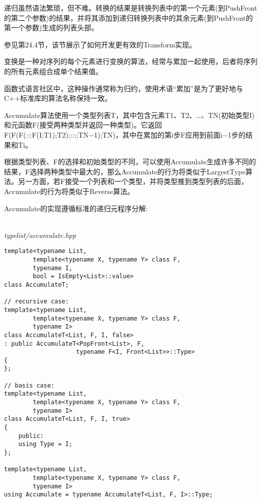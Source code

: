 递归虽然语法繁琐，但不难。转换的结果是转换列表中的第一个元素(到PushFront的第二个参数)的结果，并将其添加到递归转换列表中的其余元素(到PushFront的第一个参数)生成的列表头部。

参见第24.4节，该节展示了如何开发更有效的Transform实现。


变换是一种对序列的每个元素进行变换的算法，经常与累加一起使用，后者将序列的所有元素组合成单个结果值。

\begin{tcolorbox}[colback=webgreen!5!white,colframe=webgreen!75!black]
\hspace*{0.75cm}函数式语言社区中，这种操作通常称为归约，使用术语“累加”是为了更好地与C++标准库的算法名称保持一致。
\end{tcolorbox}

Accumulate算法使用一个类型列表T，其中包含元素T1、T2、…、TN(初始类型I)和元函数F(接受两种类型并返回一种类型)。它返回F(F(F(:::F(I;T1);T2);:::;TN−1);TN)，其中在累加的第i步F应用到前面i−1步的结果和Ti。

根据类型列表、F的选择和初始类型的不同，可以使用Accumulate生成许多不同的结果，F选择两种类型中最大的，那么Accumulate的行为将类似于LargestType算法。另一方面，若F接受一个列表和一个类型，并将类型推到类型列表的后面，Accumulate的行为将类似于Reverse算法。

Accumulate的实现遵循标准的递归元程序分解:

\hspace*{\fill} \\ %
\noindent
\textit{typelist/accumulate.hpp}
\begin{lstlisting}[style=styleCXX]
template<typename List,
		template<typename X, typename Y> class F,
		typename I,
		bool = IsEmpty<List>::value>
class AccumulateT;

// recursive case:
template<typename List,
		template<typename X, typename Y> class F,
		typename I>
class AccumulateT<List, F, I, false>
: public AccumulateT<PopFront<List>, F,
					typename F<I, Front<List>>::Type>
{
};

// basis case:
template<typename List,
		template<typename X, typename Y> class F,
		typename I>
class AccumulateT<List, F, I, true>
{
	public:
	using Type = I;
};

template<typename List,
		template<typename X, typename Y> class F,
		typename I>
using Accumulate = typename AccumulateT<List, F, I>::Type;
\end{lstlisting}

